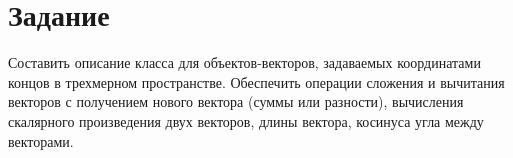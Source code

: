 \label{sec:task}
\section{Задание}

Составить описание класса для объектов-векторов, задаваемых координатами концов в трехмерном пространстве. Обеспечить операции сложения и вычитания векторов с получением нового вектора (суммы или разности), вычисления скалярного произведения двух векторов, длины вектора, косинуса угла между векторами.